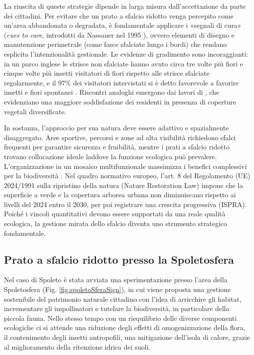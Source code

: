 \documentclass[
  a4paper,
]{book}
\begin{document}
La riuscita di queste strategie dipende in larga misura dall'accettazione da parte dei cittadini.
Per evitare che un prato a sfalcio ridotto venga percepito come un'area abbandonata o degradata, è fondamentale applicare i «segnali di cura» (\emph{cues to care}, introdotti da Nassauer nel 1995 \citep{nassauer1995}), ovvero elementi di disegno e manutenzione perimetrale (come fasce sfalciate lungo i bordi) che rendano esplicita l'intenzionalità gestionale.
Le evidenze di gradimento sono incoraggianti: in un parco inglese le strisce non sfalciate hanno avuto circa tre volte più fiori e cinque volte più insetti visitatori di fiori rispetto alle strisce sfalciate regolarmente, e il 97\% dei visitatori intervistati si è detto favorevole a favorire insetti e fiori spontanei \citep{garbuzov2015}.
Riscontri analoghi emergono dai lavori di \citet{norton2019}, che evidenziano una maggiore soddisfazione dei residenti in presenza di coperture vegetali diversificate.

In sostanza, l'approccio per sua natura deve essere adattivo e spazialmente disaggregato.
Aree sportive, percorsi e zone ad alta visibilità richiedono sfalci frequenti per garantire sicurezza e fruibilità, mentre i prati a sfalcio ridotto trovano collocazione ideale laddove la funzione ecologica può prevalere.
L'organizzazione in un mosaico multifunzionale massimizza i benefici complessivi per la biodiversità \citep{norton2019}.
Nel quadro normativo europeo, l'art.
8 del Regolamento (UE) 2024/1991 sulla ripristino della natura (Nature Restoration Law) impone che la superficie a verde e la copertura arborea urbana non diminuiscano rispetto ai livelli del 2024 entro il 2030, per poi registrare una crescita progressiva (ISPRA).
Poiché i vincoli quantitativi devono essere supportati da una reale qualità ecologica, la gestione mirata dello sfalcio diventa uno strumento strategico fondamentale.

\subsection{Prato a sfalcio ridotto presso la Spoletosfera}\label{prato-a-sfalcio-ridotto-presso-la-spoletosfera}

Nel caso di Spoleto è stata avviata una sperimentazione presso l'area della Spoletosfera (Fig. \ref{fig:spoletoSferaSign}), in cui viene proposta una gestione sostenibile del patrimonio naturale cittadino con l'idea di arricchire gli habitat, incrementare gli impollinatori e tutelare la biodiversità, in particolare della piccola fauna.
Nello stesso tempo con un riequilibrio delle diverse componenti ecologiche ci si attende una riduzione degli effetti di omogenizzazione della flora, il contenimento degli insetti antropofili, una mitigazione dell'isola di calore, grazie al miglioramento della ritenzione idrica dei suoli.
\end{document}
